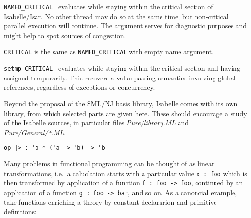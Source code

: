 \begin{isabellebody}
\begin{isamarkuptext}
  \begin{description}

  \item \verb|NAMED_CRITICAL|~ evaluates 
  while staying within the critical section of Isabelle/Isar.  No
  other thread may do so at the same time, but non-critical parallel
  execution will continue.  The  argument serves for
  diagnostic purposes and might help to spot sources of congestion.

  \item \verb|CRITICAL| is the same as \verb|NAMED_CRITICAL| with empty
  name argument.

  \item \verb|setmp_CRITICAL|~ evaluates 
  while staying within the critical section and having  assigned temporarily.  This recovers a value-passing
  semantics involving global references, regardless of exceptions or
  concurrency.

  \end{description}%
\end{isamarkuptext}%
\isamarkuptrue%
%
\endisatagmlref
{\isafoldmlref}%
%
\isadelimmlref
%
\endisadelimmlref
%
\isamarkuptrue%
%
\begin{isamarkuptext}%
Beyond the proposal of the SML/NJ basis library, Isabelle comes
  with its own library, from which selected parts are given here.
  These should encourage a study of the Isabelle sources,
  in particular files \emph{Pure/library.ML} and \emph{Pure/General/*.ML}.%
\end{isamarkuptext}%
\isamarkuptrue%
%
\isamarkuptrue%
%
\isadelimmlref
%
\endisadelimmlref
%
\isatagmlref
%
\begin{isamarkuptext}%
\begin{mldecls}
  \verb|op |\verb,|,\verb|> : 'a * ('a -> 'b) -> 'b| \\
  \end{mldecls}%
\end{isamarkuptext}%
\isamarkuptrue%
%
\endisatagmlref
{\isafoldmlref}%
%
\isadelimmlref
%
\endisadelimmlref
%
\isadelimML
%
\endisadelimML
%
\isatagML
%
\endisatagML
{\isafoldML}%
%
\isadelimML
%
\endisadelimML
%
\begin{isamarkuptext}%
\noindent Many problems in functional programming can be thought of
  as linear transformations, i.e.~a caluclation starts with a
  particular value \verb|x : foo| which is then transformed
  by application of a function \verb|f : foo -> foo|,
  continued by an application of a function \verb|g : foo -> bar|,
  and so on.  As a canoncial example, take functions enriching
  a theory by constant declararion and primitive definitions:


\end{isamarkuptext}
\end{isabellebody}
